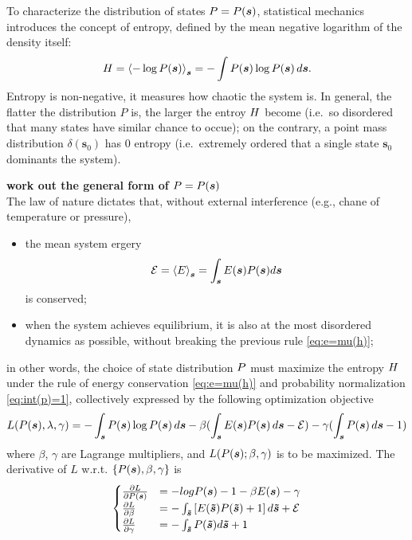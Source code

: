 \documentclass[11pt]{book}
\def\style{apa}
\numberwithin{equation}{chapter}
\newcommand{\bs}{\boldsymbol}
\newcommand{\mean}[2]{\left\langle{#1}\right\rangle_{#2}}
\newcommand{\vs}{\bs{s}}
\newcommand{\vst}{\bs{\tilde{s}}}
\newcommand{\PDV}[2]{\frac{\partial #1}{\partial #2}}
\begin{document}
To characterize the distribution of states $\pf = \ps$, statistical mechanics introduces the concept of entropy, defined by the mean negative logarithm of the density itself:
\begin{align}
  \hf = \mean{-\log{\ps}}{\vs} = -\int{\ps\log{\ps}\,d\vs}.
\end{align}
Entropy is non-negative, it measures how chaotic the system is. In general, the flatter the distribution $P$ is, the larger the entroy $H$ become (i.e.\, so disordered that many states have similar chance to occue); on the contrary, a point mass distribution $\delta(\vs_0)$ has 0 entropy (i.e.\, extremely ordered that a single state $\vs_0$ dominants the system).

\textbf{work out the general form of $\pf = \ps$} \\
The law of nature dictates that, without external interference (e.g., chane of temperature or pressure),
\begin{itemize}
\item the mean system ergery
\begin{align} \label{eq:e=mu(h)}
  \me = \mean{\ef}{\vs} = \int_{\vs} \es \ps d\vs
\end{align} is conserved;
\item when the system achieves equilibrium, it is also at the most disordered dynamics as possible, without breaking the previous rule \eqref{eq:e=mu(h)};
\end{itemize}
in other words, the choice of state distribution $P$ must maximize the entropy $H$ under the rule of energy conservation \eqref{eq:e=mu(h)} and probability normalization \eqref{eq:int(p)=1}, collectively expressed by the following optimization objective
\begin{align}\label{eq:max(e, p)}
  L(\ps, \lambda, \gamma) = -\int_{\vs}\ps\log{\ps}\,d\vs - \beta(\int_{\vs} {\es\ps\,d\vs} - \me) - \gamma(\int_{\vs}{\ps\,d\vs} - 1)
\end{align}
where $\beta$, $\gamma$ are Lagrange multipliers, and $L(\ps; \beta, \gamma)$ is to be maximized. The derivative of $L$ w.r.t. $\{\ps, \beta, \gamma\}$ is
\begin{equation*}
  \begin{cases}
    \PDV{L}{\ps}      & = -log{\ps} - 1 - \beta\es -\gamma \\
    \PDV{L}{\beta}    & = -\int_{\vst} \left[\est\pst + 1\right] d\vst + \me\\
    \PDV{L}{\gamma}   & = -\int_{\vst} \pst  d\vst + 1
  \end{cases}
\end{equation*}
\clearpage
\singlespacing


%
\end{document}
